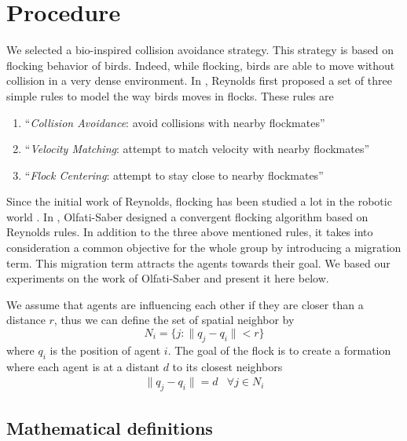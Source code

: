 \section{Procedure}

We selected a bio-inspired collision avoidance strategy. This strategy is based on flocking behavior of birds. Indeed, while flocking, birds are able to move without collision in a very dense environment. In \cite{reynolds_flocks_1987}, Reynolds first proposed a set of three simple rules to model the way birds moves in flocks. These rules are
\begin{enumerate}
 \item ``\emph{Collision Avoidance}: avoid collisions with nearby flockmates''
 \item ``\emph{Velocity Matching}: attempt to match velocity with nearby flockmates''
 \item ``\emph{Flock Centering}: attempt to stay close to nearby flockmates''
\end{enumerate}

Since the initial work of Reynolds, flocking has been studied a lot in the robotic world \cite{hauert_reynolds_2011, lindhe_flocking_2005, viragh_flocking_2013}. In \cite{olfati-saber_flocking_2006}, Olfati-Saber designed a convergent flocking algorithm based on Reynolds rules. In addition to the three above mentioned rules, it takes into consideration a common objective for the whole group by introducing a migration term. This migration term attracts the agents towards their goal. We based our experiments on the work of Olfati-Saber and present it here below. 

We assume that agents are influencing each other if they are closer than a distance $r$, thus we can define the set of spatial neighbor by
\begin{equation}
N_i=\{j:\|q_j-q_i\|<r\}
\label{eq:Ni}
\end{equation}
where $q_i$ is the position of agent $i$. 
The goal of the flock is to create a formation where each agent is at a distant $d$ to its closest neighbors
\begin{equation}
\begin{array}{ll}
\|q_j-q_i\|=d & \forall j \in N_i
\end{array}
\label{eq:lattice}
\end{equation}

\subsection{Mathematical definitions}

